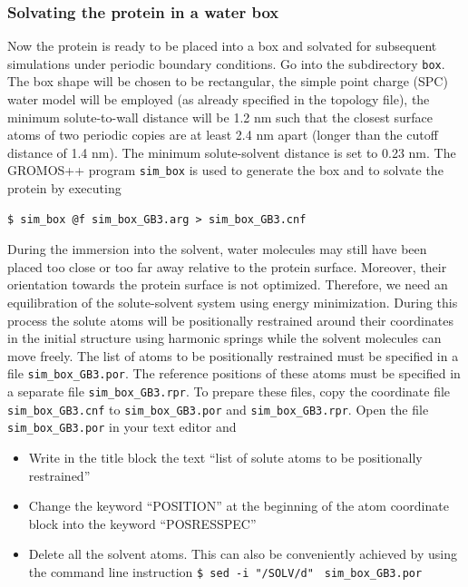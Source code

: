 \subsubsection{Solvating the protein in a water box}

Now the protein is ready to be placed into a box and solvated for subsequent simulations under periodic boundary conditions. Go into the subdirectory \texttt{box}. The box shape will be chosen to be rectangular, the simple point charge (SPC) water model \cite{Berendsen1981} will be employed (as already specified in the topology file), the minimum solute-to-wall distance will be 1.2 nm such that the closest surface atoms of two periodic copies are at least 2.4 nm apart (longer than the cutoff distance of 1.4 nm). The minimum solute-solvent distance is set to 0.23 nm. The GROMOS++ program \texttt{sim\_box} is used to generate the box and to solvate the protein by executing
\begin{lstlisting}
$ sim_box @f sim_box_GB3.arg > sim_box_GB3.cnf
\end{lstlisting}
During the immersion into the solvent, water molecules may still have been placed too close or too far away relative to the protein surface. Moreover, their orientation towards the protein surface is not optimized. Therefore, we need an equilibration of the solute-solvent system using energy minimization. During this process the solute atoms will be positionally restrained around their coordinates in the initial structure using harmonic springs while the solvent molecules can move freely. The list of atoms to be positionally restrained must be specified in a file \texttt{sim\_box\_GB3.por}. The reference positions of these atoms must be specified in a separate file \texttt{sim\_box\_GB3.rpr}. To prepare these files, copy the coordinate file \texttt{sim\_box\_GB3.cnf} to \texttt{sim\_box\_GB3.por} and \texttt{sim\_box\_GB3.rpr}. Open the file \texttt{sim\_box\_GB3.por} in your text editor and
\begin{itemize}
\item	Write in the title block the text “list of solute atoms to be positionally restrained”
\item	Change the keyword “POSITION” at the beginning of the atom coordinate block into the keyword “POSRESSPEC”
\item	Delete all the solvent atoms. This can also be conveniently achieved by using the command line instruction \lstinline !$ sed -i "/SOLV/d"! \lstinline! sim_box_GB3.por!
\end{itemize}
